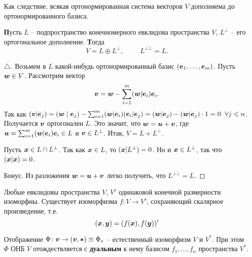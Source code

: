 Как следствие, всякая ортонормированная система векторов $V$ дополняема до ортонормированного базиса.


\begin{to_thr}
    \textbf{П}усть $L$ -- подпространство конечномерного евклидова пространства $V$, $L^{\bot}$ -- его ортогональное дополнение. \textbf{Т}огда 
    \begin{equation}
        V = L \oplus L^{\bot}, \hspace{1cm} L^{\bot \bot} = L.
    \end{equation}
\end{to_thr}

\begin{proof}[$\triangle$]
    Возьмем в $L$ какой-нибудь ортонормированный базис $(\mbox{\boldmath $e$}_{1}, \ldots, \mbox{\boldmath $e$}_m)$. Пусть $\mbox{\boldmath $w$} \in V$. Рассмотрим вектор
    $$
        \mbox{\boldmath $v$} = \mbox{\boldmath $w$} - \sum_{i=1}^m (\mbox{\boldmath $w$} | \mbox{\boldmath $e$}_i) \mbox{\boldmath $e$}_i.
    $$
    Так как $(\mbox{\boldmath $v$} | \mbox{\boldmath $e$}_j) = (\mbox{\boldmath $w$} \mid \mbox{\boldmath $e$}_j) - \sum_{i=1}^{m} (\mbox{\boldmath $w$} | \mbox{\boldmath $e$}_i) (\mbox{\boldmath $e$}_i | \mbox{\boldmath $e$}_j) = (\mbox{\boldmath $w$} | \mbox{\boldmath $e$}_j)  - (\mbox{\boldmath $w$} | \mbox{\boldmath $e$}_j) \cdot 1 = 0\; \; \forall j \leqslant n$. Получается $\mbox{\boldmath $v$}$ ортогонален $L$. Это значит, что $\mbox{\boldmath $w$} = \mbox{\boldmath $u$} + \mbox{\boldmath $v$}$, где $\mbox{\boldmath $u$} = \sum_{i=1}^{m} (\mbox{\boldmath $w$} | \mbox{\boldmath $e$}_i) \mbox{\boldmath $e$}_i \in L$ и $\mbox{\boldmath $v$} \in L^{\bot}$. Итак, $V = L + L^{\bot}$. 

    Пусть $\mbox{\boldmath $x$} \in L \cap L^{\bot}$. Так как $\mbox{\boldmath $x$} \in L$, то $(\mbox{\boldmath $x$} | L^{\bot})=0$. Но и $\mbox{\boldmath $x$} \in L^{\bot}$, так что $(\mbox{\boldmath $x$} | \mbox{\boldmath $x$}) = 0$.

    Бонус. Из разложения $\mbox{\boldmath $w$} = \mbox{\boldmath $u$} + \mbox{\boldmath $v$}$ легко получить, что $L^{\bot \bot} = L$. 
\end{proof}




\begin{to_thr}
    Любые евклидовы пространства $V$, $V'$ одинаковой конечной размерности изоморфны. Существует изоморфизма $f \colon V \to V'$, сохраняющий скалярное произведение, т.е.
    \begin{equation}
        (\mbox{\boldmath $x$}, \mbox{\boldmath $y$}) = (f(\mbox{\boldmath $x$}), f(\mbox{\boldmath $y$}))'
    \end{equation}
\end{to_thr}

\begin{to_thr}
    Отображение $\Phi \colon \mbox{\boldmath $v$} \to (\mbox{\boldmath $v$}, \mbox{\boldmath $*$}) \equiv \Phi_{v}$ -- естественный изоморфизм $V$ и $V^{*}$. При этом $\Phi$ ОНБ $V$ отождествляется с \textbf{дуальным} к нему базисом $f_1, \dots, f_n$ пространства $V^*$. 
\end{to_thr}



